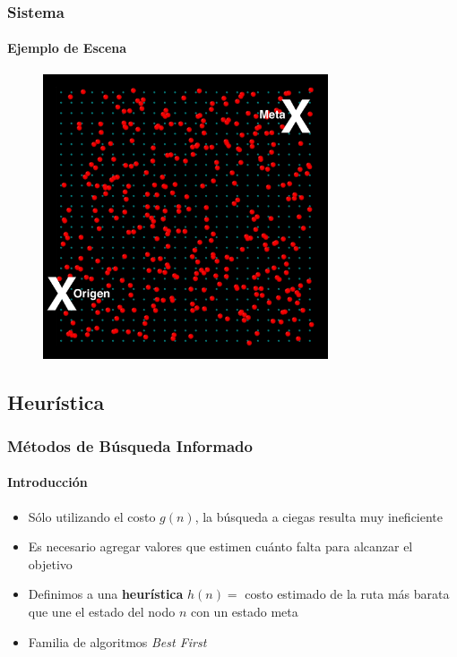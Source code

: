\documentclass[hyperref={pdfpagelayout=SinglePage}]{beamer}
\begin{document}
\begin{frame}[plain]
\frametitle{Sistema}
\framesubtitle{Ejemplo de Escena}
\begin{figure}[H]
	\centering
    \includegraphics[width=0.75\textwidth]{images/scene.png}
\end{figure}
\end{frame}

\subsection{Heurística}

\begin{frame}
\frametitle{Métodos de Búsqueda Informado}
\framesubtitle{Introducción}
\begin{itemize}
	\item Sólo utilizando el costo $g(n)$, la búsqueda a ciegas resulta muy ineficiente
	\item Es necesario agregar valores que estimen cuánto falta para alcanzar el objetivo
	\item Definimos a una \textbf{heurística} $h(n) = $ costo estimado de la ruta más barata que une el estado del nodo $n$ con un estado meta
	\item Familia de algoritmos \textit{Best First}
\end{itemize}
\end{frame}
\end{document}
